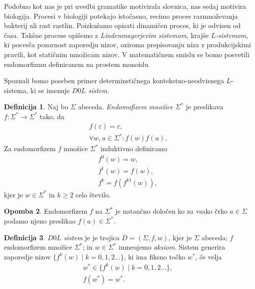 \documentclass{amsart}
\theoremstyle{definition}
\newtheorem{definicija}{Definicija}[section]
\newtheorem{opomba}[definicija]{Opomba}
\theoremstyle{plain} %
\begin{document}
Podobno kot nas je pri uvedbi gramatike motivirala slovnica, nas sedaj motivira biologija. Procesi v biologiji
potekajo istočasno, recimo proces razmnoževanja bakterij ali rast rastlin. Poizkušamo opisati dinamičen proces, ki je odvisen od časa.
Takšne procese opišemo z \textit{Lindenmayerjevim sistemom}, krajše \textit{$ L $-sistemom}, ki posveča pozornost zaporedju nizov,
oziroma prepisovanju niza z produkcijskimi pravili, kot statičnim množicam nizov. V matematičnem smislu se bomo posvetili endomorfizmu
definiranem na prostem monoidu.

Spoznali bomo poseben primer determinstičnega kontekstno-neodvisnega $ L $-sistema, ki se imenuje \textit{$ D0L $ sistem}.

\begin{definicija}
    
    Naj bo $ \Sigma $ abeceda. \textit{Endomofizem množice $ \Sigma^* $} je preslikava $ f \colon \Sigma^* \rightarrow \Sigma^* $
    tako, da 
    \begin{gather*}
        f(\varepsilon) = \varepsilon, \\
        \forall w,u \in \Sigma^* \colon f(w)f(u).
    \end{gather*}
    Za endomorfizem $ f $ množice $ \Sigma^* $ induktivno definiramo
    \begin{gather*}
        f^0(w) = w, \\
        f^1(w) = f(w), \\
        f^k = f(f^{k1}(w)),
    \end{gather*}
    kjer je $ w \in \Sigma^* $ in $ k \geq 2 $ celo število.

\end{definicija}

\begin{opomba}
    
    Endomorfizem $ f $ na $ \Sigma^* $ je natančno določen ko za vsako črko $ a \in \Sigma $ podamo njeno preslikao $ f(a) \in \Sigma^* $.

\end{opomba}

\begin{definicija}
    
    \textit{$ D0L $ sistem} je je trojica $ D = (\Sigma, f, w) $, kjer je $ \Sigma $ abeceda; $ f $ endomorfizem množice $ \Sigma^* $;
    in $ w \in \Sigma^* $ imneujemo \textit{aksiom}. Sistem generira zaporedje nizov $ \{ f^k(w) \mid k = 0, 1,2 \ldots \} $, 
    ki ima fiksno točko $ w^* $, če velja
    \begin{gather*}
        w^* \in \{ f^k(w) \mid k = 0, 1,2 \ldots \}, \\
        f(w^*)= w^*.
    \end{gather*}

\end{definicija}
\end{document}
